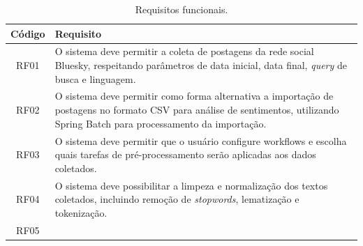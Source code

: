 \documentclass[
	12pt,				%
	oneside,			%
	a4paper,			%
	english,			%
	french,				%
	spanish,			%
	brazil				%
	]{abntex2}
\def\toprule{\hlineB{3}} %
\def\midrule{\hline}
\begin{document}
\renewcommand\LTcaptype{quadro}
\begin{longtable}[]{|c|l|}
\caption{Requisitos funcionais.\label{requisitos_funcionais}}\tabularnewline
\toprule
\begin{minipage}[b]{0.07\columnwidth}\centering
Código\strut
\end{minipage} & \begin{minipage}[b]{0.87\columnwidth}\raggedright
Requisito\strut
\end{minipage}\tabularnewline
\midrule
\endhead
\begin{minipage}[t]{0.07\columnwidth}\centering
RF01\strut
\end{minipage} & \begin{minipage}[t]{0.87\columnwidth}\raggedright
O sistema deve permitir a coleta de postagens da rede social Bluesky, respeitando parâmetros de data inicial, data final, \emph{query} de busca e linguagem.\strut
\end{minipage}\tabularnewline
\begin{minipage}[t]{0.07\columnwidth}\centering
RF02\strut
\end{minipage} & \begin{minipage}[t]{0.87\columnwidth}\raggedright
O sistema deve permitir como forma alternativa a importação de postagens no formato CSV para análise de sentimentos, utilizando Spring Batch para processamento da importação.\strut
\end{minipage}\tabularnewline
\begin{minipage}[t]{0.07\columnwidth}\centering
RF03\strut
\end{minipage} & \begin{minipage}[t]{0.87\columnwidth}\raggedright
O sistema deve permitir que o usuário configure workflows e escolha quais tarefas de pré-processamento serão aplicadas aos dados coletados.\strut
\end{minipage}\tabularnewline
\begin{minipage}[t]{0.07\columnwidth}\centering
RF04\strut
\end{minipage} & \begin{minipage}[t]{0.87\columnwidth}\raggedright
O sistema deve possibilitar a limpeza e normalização dos textos coletados, incluindo remoção de \emph{stopwords}, lematização e tokenização.\strut
\end{minipage}\tabularnewline
\begin{minipage}[t]{0.07\columnwidth}\centering
RF05\strut
\end{minipage} & \begin{minipage}[t]{0.87\columnwidth}\raggedright

\end{minipage}
\end{longtable}
\end{document}
